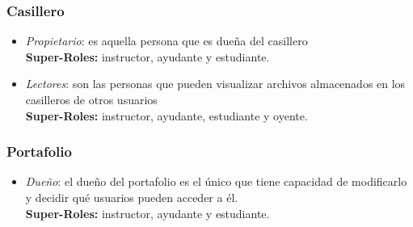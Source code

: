 \subsubsection{Casillero}
\begin{itemize}
	\item \emph{Propietario}: es aquella persona que es dueña del casillero\\ \textbf{Super-Roles:} instructor, ayudante y estudiante.
	\item \emph{Lectores}: son las personas que pueden visualizar archivos almacenados en los casilleros de otros usuarios\\ \textbf{Super-Roles:} instructor, ayudante, estudiante y oyente.
\end{itemize}

\subsubsection{Portafolio}
\begin{itemize}
	\item \emph{Dueño}: el dueño del portafolio es el único que tiene capacidad de modificarlo y decidir qué usuarios pueden acceder a él.\\
		\textbf{Super-Roles:} instructor, ayudante y estudiante.
\end{itemize}